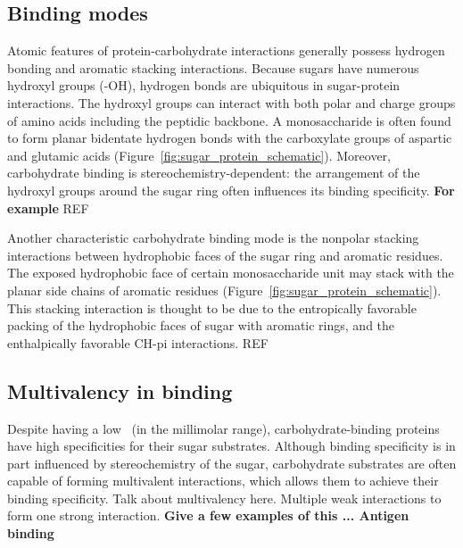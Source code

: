 \subsection{Binding modes}
Atomic features of protein-carbohydrate interactions generally possess hydrogen bonding and aromatic stacking interactions.\cite{Vyas:1991p6498} Because sugars have numerous hydroxyl groups (-OH), hydrogen bonds are ubiquitous in sugar-protein interactions. The hydroxyl groups can interact with both polar and charge groups of amino acids including the peptidic backbone.  A monosaccharide is often found to form planar bidentate hydrogen bonds with the carboxylate groups of aspartic and glutamic acids (Figure~\ref{fig:sugar_protein_schematic}).  Moreover, carbohydrate binding is stereochemistry-dependent: the arrangement of the hydroxyl groups around the sugar ring often influences its binding specificity. \textbf{For example} REF
 
Another characteristic carbohydrate binding mode is the nonpolar stacking interactions between hydrophobic faces of the sugar ring and aromatic residues.  The exposed hydrophobic face of certain monosaccharide unit may stack with the planar side chains of aromatic residues (Figure~\ref{fig:sugar_protein_schematic}).  This stacking interaction is thought to be due to the entropically favorable packing of the hydrophobic faces of sugar with aromatic rings, and the enthalpically favorable CH-pi interactions. REF %

 \subsection{Multivalency in binding}
Despite having a low \KD\ (in the millimolar range), carbohydrate-binding proteins have high specificities for their sugar substrates. Although binding specificity is in part influenced by stereochemistry of the sugar, carbohydrate substrates are often capable of forming multivalent interactions, which allows them to achieve their binding specificity.   Talk about multivalency here.  Multiple weak interactions to form one strong interaction.
\textbf{Give a few examples of this ... Antigen binding}


